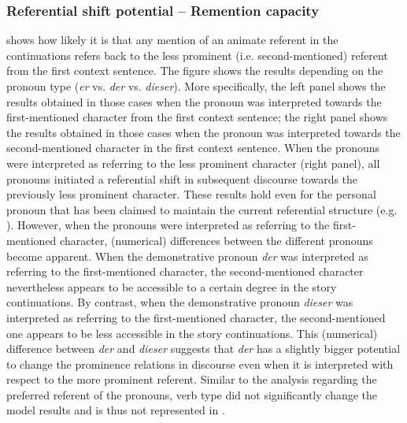 \documentclass[output=paper,colorlinks,citecolor=brown]{langscibook}
\begin{document}
\subsubsection{Referential shift potential – Remention capacity}\label{sec:fuchs:2.5.2}


 shows how likely it is that any mention of an animate referent in the continuations refers back to the less prominent (i.e. second-mentioned) referent from the first context sentence. The figure shows the results depending on the pronoun type (\textit{er} vs. \textit{der} vs. \textit{dieser}). More specifically, the left panel shows the results obtained in those cases when the pronoun was interpreted towards the first-mentioned character from the first context sentence; the right panel shows the results obtained in those cases when the pronoun was interpreted towards the second-mentioned character in the first context sentence. When the pronouns were interpreted as referring to the less prominent character (right panel), all pronouns initiated a referential shift in subsequent discourse towards the previously less prominent character. These results hold even for the personal pronoun that has been claimed to maintain the current referential structure (e.g. \citealt{Abraham2002}). However, when the pronouns were interpreted as referring to the first-mentioned character, (numerical) differences between the different pronouns become apparent. When the demonstrative pronoun \textit{der} was interpreted as referring to the first-mentioned character, the second-mentioned character nevertheless appears to be accessible to a certain degree in the story continuations. By contrast, when the demonstrative pronoun \textit{dieser} was interpreted as referring to the first-mentioned character, the second-mentioned one appears to be less accessible in the story continuations. This (numerical) difference between \textit{der} and \textit{dieser} suggests that \textit{der} has a slightly bigger potential to change the prominence relations in discourse even when it is interpreted with respect to the more prominent referent. Similar to the analysis regarding the preferred referent of the pronouns, verb type did not significantly change the model results and is thus not represented in .
\end{document}

